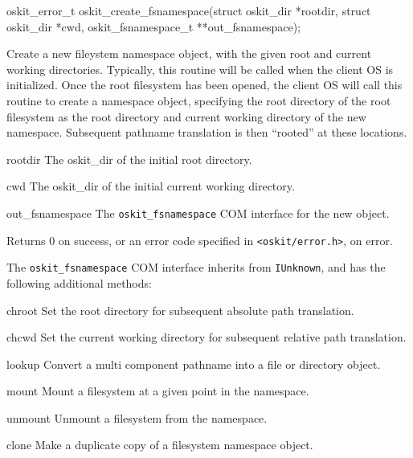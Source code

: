 \label{oskit-create-fsnamespace}
\begin{apisyn}

	\funcproto oskit_error_t
	oskit_create_fsnamespace(struct oskit_dir *rootdir,
				struct oskit_dir *cwd,
				oskit_fsnamespace_t **out_fsnamespace);
\end{apisyn}
\begin{apidesc}
	Create a new fileystem namespace object, with the given root and
	current working directories. Typically, this routine will be called
	when the client OS is initialized. Once the root filesystem has
	been opened, the client OS will call this routine to create a
	namespace object, specifying the root directory of the root
	filesystem as the root directory and current working directory of
	the new namespace. Subsequent pathname translation is then
	``rooted'' at these locations.
\end{apidesc}
\begin{apiparm}
	\item[rootdir]
		The \oskit{} oskit_dir of the initial root directory.
	\item[cwd]
		The \oskit{} oskit_dir of the initial current working
		directory. 
	\item[out_fsnamespace]
		The {\tt oskit_fsnamespace} COM interface for the new object.
\end{apiparm}
\begin{apiret}
	Returns 0 on success, or an error code specified in
	{\tt <oskit/error.h>}, on error.
\end{apiret}


The {\tt oskit_fsnamespace} COM interface inherits from {\tt IUnknown},
and has the following additional methods:	
\begin{icsymlist}
\item[chroot]
	Set the root directory for subsequent absolute path translation.
\item[chcwd]
	Set the current working directory for subsequent relative path
	translation. 
\item[lookup]
	Convert a multi component pathname into a file or directory object.
\item[mount]
	Mount a filesystem at a given point in the namespace.
\item[unmount]
	Unmount a filesystem from the namespace.
\item[clone]
	Make a duplicate copy of a filesystem namespace object.
\end{icsymlist}


